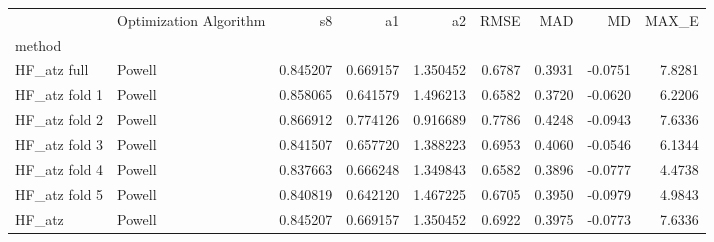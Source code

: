 \begin{tabular}{llrrrrrrr}
 & Optimization Algorithm & s8 & a1 & a2 & RMSE & MAD & MD & MAX_E \\
method &  &  &  &  &  &  &  &  \\
HF_atz full & Powell & 0.845207 & 0.669157 & 1.350452 & 0.6787 & 0.3931 & -0.0751 & 7.8281 \\
HF_atz fold 1 & Powell & 0.858065 & 0.641579 & 1.496213 & 0.6582 & 0.3720 & -0.0620 & 6.2206 \\
HF_atz fold 2 & Powell & 0.866912 & 0.774126 & 0.916689 & 0.7786 & 0.4248 & -0.0943 & 7.6336 \\
HF_atz fold 3 & Powell & 0.841507 & 0.657720 & 1.388223 & 0.6953 & 0.4060 & -0.0546 & 6.1344 \\
HF_atz fold 4 & Powell & 0.837663 & 0.666248 & 1.349843 & 0.6582 & 0.3896 & -0.0777 & 4.4738 \\
HF_atz fold 5 & Powell & 0.840819 & 0.642120 & 1.467225 & 0.6705 & 0.3950 & -0.0979 & 4.9843 \\
HF_atz & Powell & 0.845207 & 0.669157 & 1.350452 & 0.6922 & 0.3975 & -0.0773 & 7.6336 \\
\end{tabular}
